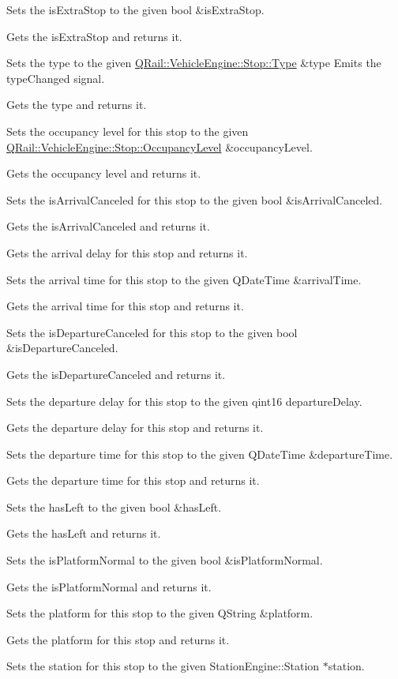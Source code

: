 Sets the is\+Extra\+Stop to the given bool \&is\+Extra\+Stop.

Gets the is\+Extra\+Stop and returns it.

Sets the type to the given \mbox{\hyperlink{classQRail_1_1VehicleEngine_1_1Stop_af078938bc06ff906b6fc843d8c0206fa}{Q\+Rail\+::\+Vehicle\+Engine\+::\+Stop\+::\+Type}} \&type Emits the type\+Changed signal.

Gets the type and returns it.

Sets the occupancy level for this stop to the given \mbox{\hyperlink{classQRail_1_1VehicleEngine_1_1Stop_ad967ed81b19762bd582c1af07354a6d4}{Q\+Rail\+::\+Vehicle\+Engine\+::\+Stop\+::\+Occupancy\+Level}} \&occupancy\+Level.

Gets the occupancy level and returns it.

Sets the is\+Arrival\+Canceled for this stop to the given bool \&is\+Arrival\+Canceled.

Gets the is\+Arrival\+Canceled and returns it.

Gets the arrival delay for this stop and returns it.

Sets the arrival time for this stop to the given Q\+Date\+Time \&arrival\+Time.

Gets the arrival time for this stop and returns it.

Sets the is\+Departure\+Canceled for this stop to the given bool \&is\+Departure\+Canceled.

Gets the is\+Departure\+Canceled and returns it.

Sets the departure delay for this stop to the given qint16 departure\+Delay.

Gets the departure delay for this stop and returns it.

Sets the departure time for this stop to the given Q\+Date\+Time \&departure\+Time.

Gets the departure time for this stop and returns it.

Sets the has\+Left to the given bool \&has\+Left.

Gets the has\+Left and returns it.

Sets the is\+Platform\+Normal to the given bool \&is\+Platform\+Normal.

Gets the is\+Platform\+Normal and returns it.

Sets the platform for this stop to the given Q\+String \&platform.

Gets the platform for this stop and returns it.

Sets the station for this stop to the given Station\+Engine\+::\+Station $\ast$station.

